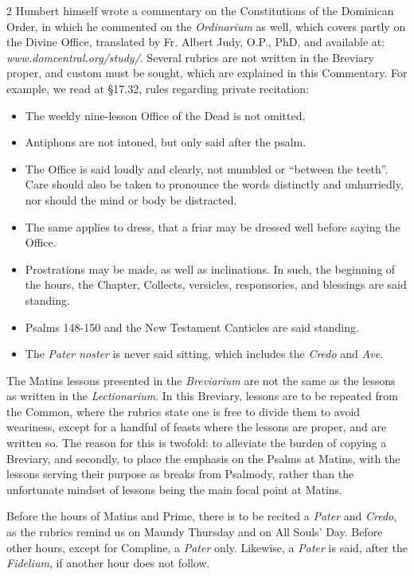 \begin{multicols}{2}
Humbert himself wrote a commentary on the Constitutions of the Dominican Order, in which he commented on the \emph{Ordinarium} as well, which covers partly on the Divine Office, translated by Fr. Albert Judy, O.P., PhD, and available at: \emph{www.domcentral.org/study/}. Several rubrics are not written in the Breviary proper, and custom must be sought, which are explained in this Commentary. For example, we read at \S 17.32, rules regarding private recitation:
\begin{itemize}[nosep,leftmargin=8pt]
	\item The weekly nine-lesson Office of the Dead is not omitted,
	\item Antiphons are not intoned, but only said after the psalm.
	\item The Office is said loudly and clearly, not mumbled or ``between the teeth''. Care should also be taken to pronounce the words distinctly and unhurriedly, nor should the mind or body be distracted.
	\item The same applies to dress, that a friar may be dressed well before saying the Office.
	\item Prostrations may be made, as well as inclinations. In such, the beginning of the hours, the Chapter, Collects, versicles, responsories, and blessings are said standing.
	\item Psalms 148-150 and the New Testament Canticles are said standing.
	\item The \emph{Pater noster} is never said sitting, which includes the \emph{Credo} and \emph{Ave}.
\end{itemize}


The Matins lessons presented in the \emph{Breviarium} are not the same as the lessons as written in the \emph{Lectionarium}. In this Breviary, lessons are to be repeated from the Common, where the rubrics state one is free to divide them to avoid weariness, except for a handful of feasts where the lessons are proper, and are written so. The reason for this is twofold: to alleviate the burden of copying a Breviary, and secondly, to place the emphasis on the Psalms at Matins, with the lessons serving their purpose as breaks from Psalmody, rather than the unfortunate mindset of lessons being the main focal point at Matins.

Before the hours of Matins and Prime, there is to be recited a \emph{Pater} and \emph{Credo}, as the rubrics remind us on Maundy Thursday and on All Souls' Day. Before other hours, except for Compline, a \emph{Pater} only. Likewise, a \emph{Pater} is said, after the \emph{Fidelium}, if another hour does not follow.



\end{multicols}
